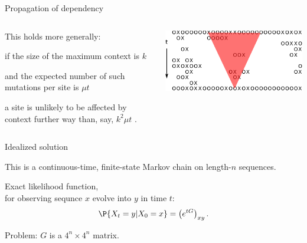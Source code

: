\documentclass[smaller]{beamer}
\begin{document}
\begin{frame}{Propagation of dependency}

  \begin{columns}[c]
    \begin{column}{.5\textwidth}

      This holds more generally:

      \vspace{1em}

      if the size of the maximum context is $k$

      \vspace{1em}

      and the expected number of such mutations per site is $\mu t$

      \vspace{1em}

      a site is unlikely to be affected by context further way than, say, $k^2 \mu t$ .

    \end{column}
    \begin{column}{.5\textwidth}

      \includegraphics[width=\textwidth]{../../../writeup-plots/talk-tasep-fig-3}

    \end{column}
  \end{columns}

\end{frame}



\begin{frame}{Idealized solution}

  This is a continuous-time, finite-state Markov chain on length-$n$ sequences.
  
  \vspace{1em}

  Exact likelihood function, \\
  \hspace{2em} for observing sequnce $x$ evolve into $y$ in time $t$:
  \begin{align*}
    \P\{ X_t = y | X_0 = x \} = \left( e^{tG} \right)_{xy} .
  \end{align*}

  \vspace{1em}

  {\newthing Problem:} $G$ is a $4^n \times 4^n$ matrix.

\end{frame}
\end{document}
